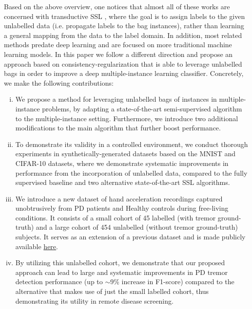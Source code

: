 \documentclass[journal,twoside,web]{ieeecolor}
\begin{document}
Based on the above overview, one notices that almost all of these works
are concerned with transductive SSL \cite{vapnik200624}, where
the goal is to assign labels to the given unlabelled data (i.e. propagate
labels to the bag instances), rather than learning a general mapping from the
data to the label domain. In addition, most related methods predate deep
learning and are focused on more traditional machine learning models. In this paper we
follow a different direction and propose an approach based on
consistency-regularization that is able to  leverage unlabelled bags in order to
improve a deep multiple-instance learning classifier. Concretely, we make the
following contributions:
\begin{enumerate}[(i)]
        \item We propose a method for leveraging unlabelled bags of instances in
          multiple-instance problems, by adapting a state-of-the-art
          semi-supervised algorithm to the multiple-instance setting.
          Furthermore, we introduce two additional modifications to the main
          algorithm that further boost performance. 
        \item To demonstrate its validity in a controlled environment, we 
          conduct thorough experiments in synthetically-generated datasets based
          on the MNIST and CIFAR-10 datasets, where we demonstrate systematic
          improvements in performance from the incorporation of unlabelled data,
          compared to the fully supervised baseline and two alternative
          state-of-the-art SSL algorithms.
        \item We introduce a new dataset of hand acceleration recordings
          captured unobtrusively from PD patients and Healthy controls during
          free-living conditions. It consists of a small cohort of 45 labelled
          (with  tremor ground-truth) and a large cohort of 454 unlabelled
          (without tremor ground-truth) subjects. It serves as an extension of a
          previous dataset  and is made publicly available
          \href{https://doi.org/10.5281/zenodo.7273759}{here}.
        \item By utilizing this unlabelled cohort, we demonstrate that our
          proposed approach can lead  to large and systematic improvements in PD tremor
          detection performance (up to $\sim$9\% increase in F1-score) compared to the
          alternative  that makes use of just the small labelled cohort,
          thus demonstrating its utility in remote disease screening.
\end{enumerate}
\end{document}
